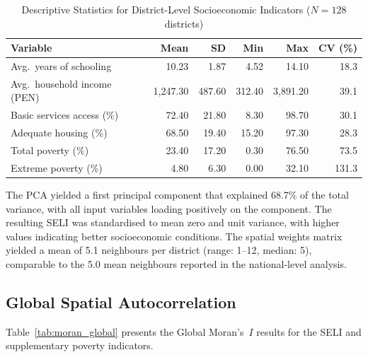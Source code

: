 \documentclass[12pt,a4paper,twoside]{article}
\begin{document}
\begin{table}[htbp]
  \centering
  \caption{Descriptive Statistics for District-Level Socioeconomic Indicators
           ($N = 128$ districts)}
  \label{tab:descriptives}
  \begin{tabular}{lrrrrr}
    \toprule
    Variable & Mean & SD & Min & Max & CV (\%) \\
    \midrule
    Avg.\ years of schooling & 10.23 & 1.87 & 4.52 & 14.10 & 18.3 \\
    Avg.\ household income (PEN) & 1,247.30 & 487.60 & 312.40 & 3,891.20 & 39.1 \\
    Basic services access (\%) & 72.40 & 21.80 & 8.30 & 98.70 & 30.1 \\
    Adequate housing (\%) & 68.50 & 19.40 & 15.20 & 97.30 & 28.3 \\
    Total poverty (\%) & 23.40 & 17.20 & 0.30 & 76.50 & 73.5 \\
    Extreme poverty (\%) & 4.80 & 6.30 & 0.00 & 32.10 & 131.3 \\
    \bottomrule
  \end{tabular}
\end{table}

The PCA yielded a first principal component that explained 68.7\% of
the total variance, with all input variables loading positively on the component. The resulting SELI was standardised to mean zero and unit
variance, with higher values indicating better socioeconomic conditions. The
spatial weights matrix yielded a mean of 5.1 neighbours per district
(range: 1--12, median: 5), comparable to the 5.0 mean neighbours reported
in the national-level analysis.

\subsection{Global Spatial Autocorrelation}

Table~\ref{tab:moran_global} presents the Global Moran's~$I$ results for the
SELI and supplementary poverty indicators.
\end{document}
